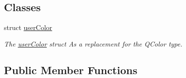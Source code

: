 \subsection*{Classes}
\begin{DoxyCompactItemize}
\item 
struct \hyperlink{structserver_1_1irc_user_1_1user_color}{user\-Color}
\begin{DoxyCompactList}\small\item\em The \hyperlink{structserver_1_1irc_user_1_1user_color}{user\-Color} struct As a replacement for the Q\-Color type. \end{DoxyCompactList}\end{DoxyCompactItemize}
\subsection*{Public Member Functions}
